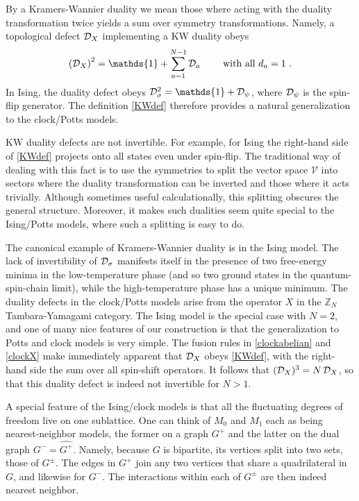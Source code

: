 By a Kramers-Wannier duality we mean those where acting with the duality transformation twice yields a sum over symmetry transformations. Namely, a topological defect $\mathcal{D}_{X}$ implementing a KW duality obeys
\begin{align}
\left(\mcd_X \right)^2 =\mathds{1}+\sum_{a=1}^{N-1} \mcd_a\qquad\hbox{ with all }d_a=1\ .
\label{KWdef}
\end{align}
In Ising, the duality defect obeys $\mcd_\sigma^2 = \mathds{1} +\mcd_\psi$, where $\mathcal{D}_\psi$ is the spin-flip generator.  The definition \eqref{KWdef} therefore provides a natural generalization to the clock/Potts models. 

KW duality defects are not invertible. For example, for Ising the right-hand side of \eqref{KWdef} projects onto all states even under spin-flip. The traditional way of dealing with this fact is to use the symmetries to split the vector space $\mathcal{V}$ into sectors where the duality transformation can be inverted and those where it acts trivially. Although sometimes useful calculationally, this splitting obscures the general structure. Moreover, it makes such dualities seem quite special to the Ising/Potts models, where such a splitting is easy to do. 

The canonical example of Kramers-Wannier duality is in the Ising model. The lack of invertibility of $\mathcal{D}_\sigma$ manifests itself in the presence of two free-energy minima in the low-temperature phase (and so two ground states in the quantum-spin-chain limit), while the high-temperature phase has a unique minimum. 
The duality defects in the clock/Potts models arise from the operator $X$ in the $\mathbb{Z}_N$ Tambara-Yamagami category. The Ising model is the special case with $N=2$, and one of many nice features of our construction is that the generalization to Potts and clock models is very simple.  The fusion rules in  \eqref{clockabelian} and \eqref{clockX} make immediately apparent that $\mathcal{D}_X$ obeys \eqref{KWdef}, with the right-hand side the sum over all spin-shift operators. It follows that $(\mathcal{D}_X)^3 = N\,\mathcal{D}_X$, so that this duality defect is indeed not invertible for $N>1$. 

A special feature of the Ising/clock models is that all the fluctuating degrees of freedom live on one sublattice. One can think of ${M}_0$ and $M_1$ each as being nearest-neighbor models, the former on a graph $G^+$ and the latter on the dual graph $G^-=\widehat{G^+}$. Namely, because $G$ is bipartite, its vertices split into two sets, those of $G^\pm$. The edges in $G^+$ join any two vertices that share a quadrilateral in $G$, and likewise for $G^-$.  The interactions within each of $G^\pm$ are then indeed nearest neighbor. 

